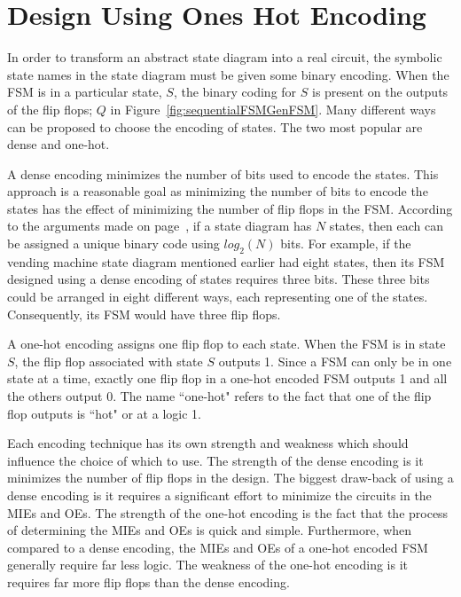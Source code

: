 
\section{Design Using Ones Hot Encoding}

In order to transform an abstract state diagram into a real circuit, the 
symbolic state names in the state diagram must be given some binary encoding.  
When the FSM is in a particular state, $S$, the binary coding for $S$ 
is present on the outputs of the flip flops; $Q$ in Figure~\ref{fig:sequentialFSMGenFSM}.
Many different ways can be proposed to choose the encoding of states.  The two most 
popular are dense and one-hot.

A dense encoding minimizes the number of bits used to encode the 
states.  This approach 
is a reasonable goal as minimizing the number of bits to encode the states
has the effect of minimizing the number of flip flops in the FSM.  According to
the arguments made on page~\pageref{page:two-to-N}, if a state diagram has $N$ 
states, then each can be assigned a unique binary code using $log_2(N)$ bits.  
For example, if the vending machine state diagram mentioned earlier had eight  
states, then its FSM designed using a dense encoding of states requires 
three bits.  These three bits could be arranged in eight different ways, each representing
one of the states.  Consequently, its FSM would have three flip flops.

A one-hot encoding assigns one flip flop to each state.  When the FSM is in
state $S$, the flip flop associated with state $S$ outputs 1. Since a FSM can
only be in one state at a time, exactly one flip flop in a one-hot encoded FSM 
outputs 1 and all the others output 0.  The name ``one-hot" refers to the 
fact that one of the flip flop outputs is ``hot" or at a logic 1.

Each encoding technique has its own strength and weakness which should 
influence the choice of which to use.  The strength of the dense encoding 
is it minimizes the number of flip flops in the design.  The biggest 
draw-back of using a dense
encoding is it requires a significant effort to minimize the circuits
in the MIEs and OEs. The strength of the one-hot encoding is the fact that
the process of determining the MIEs and OEs is quick and simple.  Furthermore, 
when compared to a dense encoding, the MIEs and OEs of a one-hot encoded FSM
generally require far less logic.
The weakness of the one-hot encoding is it requires far more flip flops
than the dense encoding.

